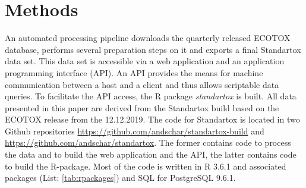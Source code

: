 \documentclass[journal,datadescriptor,accept,moreauthors,pdftex]{Definitions/mdpi}
\begin{document}
\section{Methods}
An automated processing pipeline downloads the quarterly released ECOTOX database, performs several preparation steps on it and exports a final Standartox data set. This data set is accessible via a web application and an application programming interface (API). An API provides the means for machine communication between a host and a client and thus allows scriptable data queries. To facilitate the API access, the R \citep{rcoreteam_language_2017} package \textit{standartox} is built. All data presented in this paper are derived from the Standartox build based on the ECOTOX release from the 12.12.2019. The code for Standartox is located in two Github repositories \url{https://github.com/andschar/standartox-build} and \url{https://github.com/andschar/standartox}. The former contains code to process the data and to build the web application and the API, the latter contains code to build the R-package. Most of the code is written in R 3.6.1 and associated packages (List: \ref{tab:rpackages}) and SQL for PostgreSQL 9.6.1.
\end{document}
